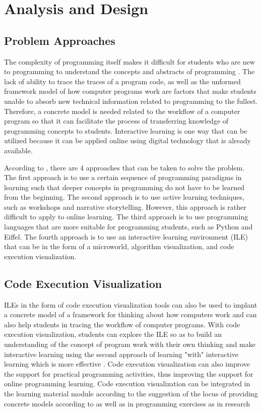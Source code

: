 \documentclass[conference]{IEEEtran}
\begin{document}
\section{Analysis and Design}
\subsection{Problem Approaches}
The complexity of programming itself makes it difficult for students who are new to programming to understand the concepts and abstracts of programming \cite{moons2013pilot}. The lack of ability to trace the traces of a program code, as well as the unformed framework model of how computer programs work \cite{mayer1981psychology} are factors that make students unable to absorb new technical information related to programming to the fullest. Therefore, a concrete model is needed related to the workflow of a computer program so that it can facilitate the process of transferring knowledge of programming concepts to students. Interactive learning is one way that can be utilized because it can be applied online using digital technology that is already available.

According to \cite{moons2013pilot}, there are 4 approaches that can be taken to solve the problem. The first approach is to use a certain sequence of programming paradigms in learning such that deeper concepts in programming do not have to be learned from the beginning. The second approach is to use active learning techniques, such as workshops and narrative storytelling. However, this approach is rather difficult to apply to online learning. The third approach is to use programming languages that are more suitable for programming students, such as Python and Eiffel. The fourth approach is to use an interactive learning environment (ILE) that can be in the form of a microworld, algorithm visualization, and code execution visualization.

\subsection{Code Execution Visualization}
ILEs in the form of code execution visualization tools can also be used to implant a concrete model of a framework for thinking about how computers work \cite{mayer1981psychology} and can also help students in tracing the workflow of computer programs. With code execution visualization, students can explore the ILE so as to build an understanding of the concept of program work with their own thinking and make interactive learning using the second approach of learning "with" interactive learning which is more effective \cite{reeves2012interactive}. Code execution visualization can also improve the support for practical programming activities, thus improving the support for online programming learning. Code execution visualization can be integrated in the learning material module according to the suggestion of the locus of providing concrete models according to \cite{mayer1981psychology} as well as in programming exercises as in research \cite{moons2013pilot}
\end{document}

